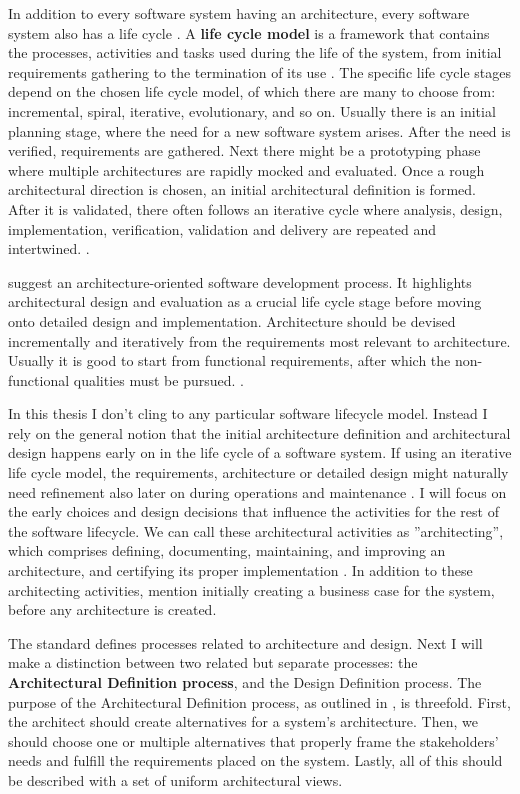 \documentclass[utf8,english]{gradu3}
\begin{document}
In addition to every software system having an architecture, every software
system also has a life cycle \parencite[17]{IEEE12207}. A \textbf{life
  cycle model} is a framework that contains the processes, activities and tasks
used during the life of the system, from initial requirements gathering to the
termination of its use \parencite[3]{IEEE42010}. The specific life cycle stages
depend on the chosen life cycle model, of which there are many to choose from:
incremental, spiral, iterative, evolutionary, and so on. Usually there is an
initial planning stage, where the need for a new software system arises. After
the need is verified, requirements are gathered. Next there might be a
prototyping phase where multiple architectures are rapidly mocked and evaluated.
Once a rough architectural direction is chosen, an initial architectural
definition is formed. After it is validated, there often follows an iterative
cycle where analysis, design, implementation, verification, validation and
delivery are repeated and intertwined. \parencite[18]{IEEE12207}.

\textcite{Koskimies2005} suggest an architecture-oriented software development
process. It highlights architectural design and evaluation as a crucial life
cycle stage before moving onto detailed design and implementation. Architecture
should be devised incrementally and iteratively from the requirements most
relevant to architecture. Usually it is good to start from functional
requirements, after which the non-functional qualities must be pursued.
\parencite{Koskimies2005}.

In this thesis I don't cling to any particular software lifecycle model.
Instead I rely on the general notion that the initial architecture definition
and architectural design happens early on in the life cycle of a software
system. If using an iterative life cycle model, the requirements, architecture or detailed design might naturally need
refinement also later on during operations and maintenance \parencite{IEEE12207}.
I will focus on the early
choices and design decisions that influence the activities for the rest of the
software lifecycle. We can call these architectural activities as
''architecting'', which comprises defining, documenting, maintaining, and improving an architecture,
and certifying its proper implementation \parencite[3]{IEEE42010}.
In addition to these architecting activities,
\textcite[12]{Bass1998} mention initially creating a business case for the system, before any architecture is created.

The standard \textcite{IEEE12207} defines processes related to architecture and design. Next
I will make a distinction between two related but separate processes: the
\textbf{Architectural Definition process}, and the Design Definition process.
The purpose of the Architectural Definition process, as outlined in
\textcite[66]{IEEE12207}, is threefold. First, the architect should create
alternatives for a system's architecture. Then, we should choose one or
multiple alternatives that properly frame the stakeholders' needs and fulfill
the requirements placed on the system. Lastly, all of this should be described
with a set of uniform architectural views.
\end{document}
